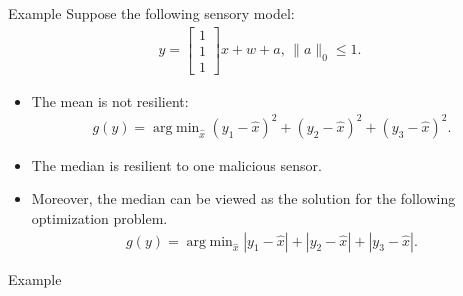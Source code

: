 \documentclass[10pt]{beamer}
\DeclareMathOperator{\argmin}{arg\;min}
\begin{document}
\begin{frame}{Example}
  Suppose the following sensory model:
  \begin{align*}
    y = \begin{bmatrix}
      1\\
      1\\
      1
    \end{bmatrix}x + w+a,\,\|a\|_0\leq 1.
  \end{align*}
  \begin{itemize}
   \item The mean is not resilient: 
  \begin{align*}
    g(y) = \argmin_{\hat x}  (y_1-\hat x)^2+(y_2-\hat x)^2+(y_3-\hat x)^2.
  \end{align*}
    \item The median is resilient to one malicious sensor.
    \item Moreover, the median can be viewed as the solution for the following optimization problem. 
  \begin{align*}
    g(y) = \argmin_{\hat x}  |y_1-\hat x|+|y_2-\hat x|+|y_3-\hat x|.
  \end{align*}
  \end{itemize}
\end{frame}

\begin{frame}{Example}
  \begin{figure}[ht]
    \centering
  \end{figure}
\end{frame}
\end{document}
